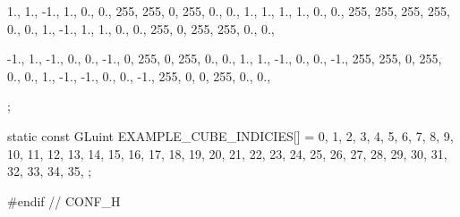 \begin{multicols}{2}
\begin{ccode}
{    {{ 1.,  1., -1.}, { 1.,  0.,  0.}, {255, 255,   0, 255}, {0., 0.}},
    {{ 1.,  1.,  1.}, { 1.,  0.,  0.}, {255, 255, 255, 255}, {0., 0.}},
    {{ 1., -1.,  1.}, { 1.,  0.,  0.}, {255,   0, 255, 255}, {0., 0.}},

    {{-1.,  1., -1.}, { 0.,  0., -1.}, {  0, 255,   0, 255}, {0., 0.}},
    {{ 1.,  1., -1.}, { 0.,  0., -1.}, {255, 255,   0, 255}, {0., 0.}},
    {{ 1., -1., -1.}, { 0.,  0., -1.}, {255,   0,   0, 255}, {0., 0.}},
};

static const GLuint EXAMPLE_CUBE_INDICIES[] = {
     0,  1,  2,  3,  4,  5,  6,  7,  8,  9, 10, 11,
    12, 13, 14, 15, 16, 17, 18, 19, 20, 21, 22, 23,
    24, 25, 26, 27, 28, 29, 30, 31, 32, 33, 34, 35,
};

#endif // CONF_H
\end{ccode}
\end{multicols}
